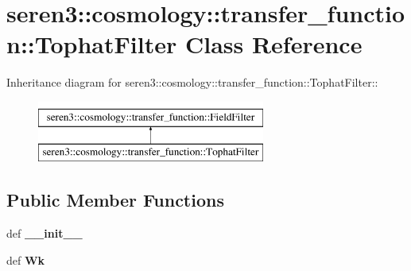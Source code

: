 \hypertarget{classseren3_1_1cosmology_1_1transfer__function_1_1TophatFilter}{
\section{seren3::cosmology::transfer\_\-function::TophatFilter Class Reference}
\label{classseren3_1_1cosmology_1_1transfer__function_1_1TophatFilter}
}
Inheritance diagram for seren3::cosmology::transfer\_\-function::TophatFilter::\begin{figure}[H]
\begin{center}
\leavevmode
\includegraphics[height=2cm]{classseren3_1_1cosmology_1_1transfer__function_1_1TophatFilter}
\end{center}
\end{figure}
\subsection*{Public Member Functions}
\begin{DoxyCompactItemize}
\item 
\hypertarget{classseren3_1_1cosmology_1_1transfer__function_1_1TophatFilter_af3753b34989c1a32eb68b4e156386cb2}{
def {\bfseries \_\-\_\-init\_\-\_\-}}
\label{classseren3_1_1cosmology_1_1transfer__function_1_1TophatFilter_af3753b34989c1a32eb68b4e156386cb2}

\item 
\hypertarget{classseren3_1_1cosmology_1_1transfer__function_1_1TophatFilter_a0e3e758d585659b7491ef868b0f48bc0}{
def {\bfseries Wk}}
\label{classseren3_1_1cosmology_1_1transfer__function_1_1TophatFilter_a0e3e758d585659b7491ef868b0f48bc0}

\end{DoxyCompactItemize}
